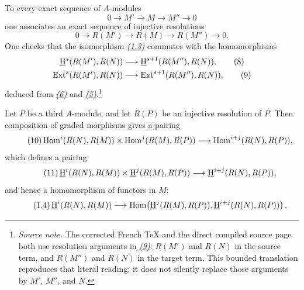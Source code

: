 To every exact sequence of $A$-modules
\begin{equation}\tag{5}\label{eq:V.5}
  0\longrightarrow M'\longrightarrow M\longrightarrow M''\longrightarrow 0
\end{equation}
one associates an exact sequence of injective resolutions
\begin{equation}\tag{6}\label{eq:V.6}
  0\longrightarrow R(M')\longrightarrow R(M)
    \longrightarrow R(M'')\longrightarrow 0.
\end{equation}
One checks that the isomorphism \emph{\hyperref[eq:V.1.3]{(1.3)}} commutes with the homomorphisms
\begin{align}
  \mathop{\underline{\mathrm H}}\nolimits^s(R(M'),R(N))
    &\longrightarrow \mathop{\underline{\mathrm H}}\nolimits^{s+1}(R(M''),R(N)),\tag{8}\label{eq:V.8}\\
  \operatorname{Ext}^s(R(M'),R(N))
    &\longrightarrow \operatorname{Ext}^{s+1}(R(M''),R(N)),\tag{9}\label{eq:V.9}
\end{align}
deduced from \emph{\hyperref[eq:V.6]{(6)}} and \emph{\hyperref[eq:V.5]{(5)}}.\footnote{\textit{Source note.}
The corrected French TeX and the direct compiled source page both use
resolution arguments in \emph{\hyperref[eq:V.9]{(9)}}: $R(M')$ and $R(N)$ in the source term,
and $R(M'')$ and $R(N)$ in the target term. This bounded translation
reproduces that literal reading; it does not silently replace those arguments
by $M'$, $M''$, and $N$.}

Let $P$ be a third $A$-module, and let $R(P)$ be an injective
resolution of $P$. Then composition of graded morphisms gives a pairing
\begin{equation}\tag{10}\label{eq:V.10}
  \operatorname{Hom}^i(R(N),R(M))\times\operatorname{Hom}^j(R(M),R(P))
    \longrightarrow \operatorname{Hom}^{i+j}(R(N),R(P)),
\end{equation}
which defines a pairing
\begin{equation}\tag{11}\label{eq:V.11}
  \mathop{\underline{\mathrm H}}\nolimits^i(R(N),R(M))\times\mathop{\underline{\mathrm H}}\nolimits^j(R(M),R(P))
    \longrightarrow \mathop{\underline{\mathrm H}}\nolimits^{i+j}(R(N),R(P)),
\end{equation}
and hence a homomorphism of functors in $M$:
\begin{equation*}\tag{1.4}\label{eq:V.1.4}
  \mathop{\underline{\mathrm H}}\nolimits^i(R(N),R(M))\longrightarrow
  \operatorname{Hom}\!\left(\mathop{\underline{\mathrm H}}\nolimits^j(R(M),R(P)),\mathop{\underline{\mathrm H}}\nolimits^{i+j}(R(N),R(P))\right).
\end{equation*}

